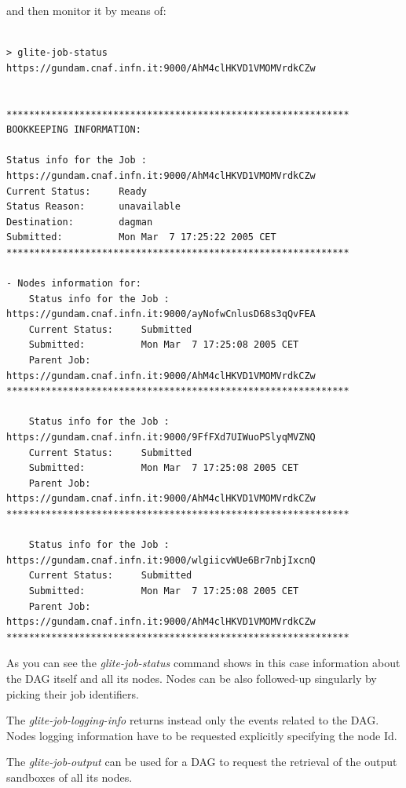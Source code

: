 and then monitor it by means of:


\smallskip
\begin{scriptsize}
\begin{verbatim}

> glite-job-status https://gundam.cnaf.infn.it:9000/AhM4clHKVD1VMOMVrdkCZw


*************************************************************
BOOKKEEPING INFORMATION:

Status info for the Job : https://gundam.cnaf.infn.it:9000/AhM4clHKVD1VMOMVrdkCZw
Current Status:     Ready 
Status Reason:      unavailable
Destination:        dagman
Submitted:          Mon Mar  7 17:25:22 2005 CET
*************************************************************

- Nodes information for: 
    Status info for the Job : https://gundam.cnaf.infn.it:9000/ayNofwCnlusD68s3qQvFEA
    Current Status:     Submitted 
    Submitted:          Mon Mar  7 17:25:08 2005 CET
    Parent Job:         https://gundam.cnaf.infn.it:9000/AhM4clHKVD1VMOMVrdkCZw
*************************************************************
    
    Status info for the Job : https://gundam.cnaf.infn.it:9000/9FfFXd7UIWuoPSlyqMVZNQ
    Current Status:     Submitted 
    Submitted:          Mon Mar  7 17:25:08 2005 CET
    Parent Job:         https://gundam.cnaf.infn.it:9000/AhM4clHKVD1VMOMVrdkCZw
*************************************************************
    
    Status info for the Job : https://gundam.cnaf.infn.it:9000/wlgiicvWUe6Br7nbjIxcnQ
    Current Status:     Submitted 
    Submitted:          Mon Mar  7 17:25:08 2005 CET
    Parent Job:         https://gundam.cnaf.infn.it:9000/AhM4clHKVD1VMOMVrdkCZw
*************************************************************

\end{verbatim}
\end{scriptsize}
\smallskip

As you can see the \emph{glite-job-status} command shows in this case information about the DAG
itself and all its nodes. Nodes can be also followed-up singularly by picking their job identifiers.

The \emph{glite-job-logging-info} returns instead only the events related to the DAG. Nodes logging information
have to be requested explicitly specifying the node Id. 

The \emph{glite-job-output} can be used for a DAG to request the retrieval of the output sandboxes of all its nodes. 

